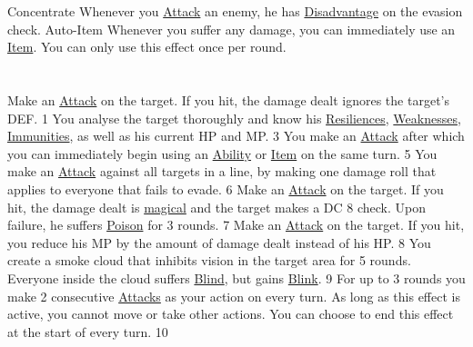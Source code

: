 {Concentrate}
{	
	Whenever you \hyperlink{action}{Attack} an enemy, he has \hyperlink{check}{Disadvantage} on the evasion check.
}
{Auto-Item}
{	
	Whenever you suffer any damage, you can immediately use an \hyperlink{item}{Item}.
	You can only use this effect once per round.
}
\pagebreak \\
\\\\
	{
		Make an \hyperlink{action}{Attack} on the target. 
		If you hit, the damage dealt ignores the target's DEF.
	}{}{1}
	{
		You analyse the target thoroughly and know his \hyperlink{type}{Resiliences}, \hyperlink{type}{Weaknesses}, \hyperlink{type}{Immunities}, as well as his current HP and MP.
	}{}{3}
	{
		You make an \hyperlink{action}{Attack} after which you can immediately begin using an \hyperlink{action}{Ability} or \hyperlink{item}{Item} on the same turn.
	}{}{5}
	{
		You make an \hyperlink{action}{Attack} against all targets in a line, by making one damage roll that applies to everyone that fails to evade.	
	}{}{6}
	{
		Make an \hyperlink{action}{Attack} on the target. 
		If you hit, the damage dealt is \hyperlink{type}{magical} and the target makes a DC 8 check. 
		Upon failure, he suffers \hyperlink{status}{Poison} for 3 rounds.	
	}{\poison}{7}
	{
		Make an \hyperlink{action}{Attack} on the target.
		If you hit, you reduce his MP by the amount of damage dealt instead of his HP.
	}{}{8}
	{
		You create a smoke cloud that inhibits vision in the target area for 5 rounds.
		Everyone inside the cloud suffers \hyperlink{status}{Blind}, but gains \hyperlink{status}{Blink}.
	}{\blind\blink}{9}
	{
		For up to 3 rounds you make 2 consecutive \hyperlink{action}{Attacks} as your action on every turn.
		As long as this effect is active, you cannot move or take other actions.
		You can choose to end this effect at the start of every turn.
	}{}{10}
\pagebreak

